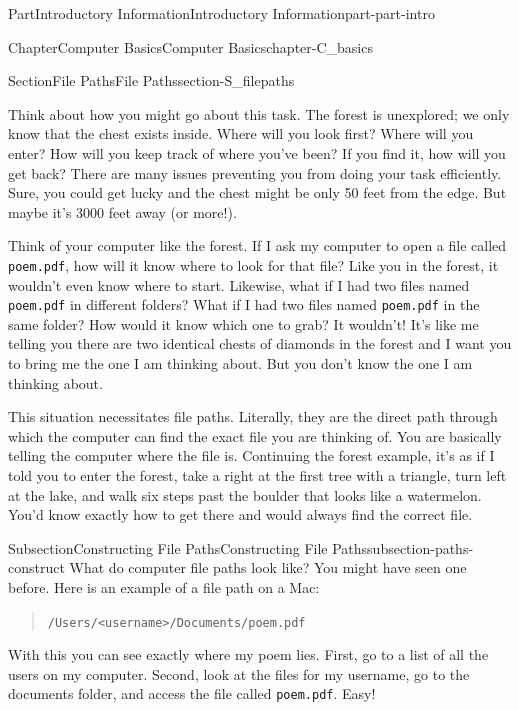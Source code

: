 \documentclass[twoside,10pt,]{book}
\newcommand{\mono}[1]{\texttt{#1}}
\begin{document}
\begin{partptx}{Part}{Introductory Information}{}{Introductory Information}{}{}{part-part-intro}
\begin{chapterptx}{Chapter}{Computer Basics}{}{Computer Basics}{}{}{chapter-C_basics}
\begin{sectionptx}{Section}{File Paths}{}{File Paths}{}{}{section-S_filepaths}
\begin{introduction}{}
\par
Think about how you might go about this task. The forest is unexplored; we only know that the chest exists inside. Where will you look first? Where will you enter? How will you keep track of where you've been? If you find it, how will you get back? There are many issues preventing you from doing your task efficiently. Sure, you could get lucky and the chest might be only 50 feet from the edge. But maybe it's 3000 feet away (or more!).%
\par
Think of your computer like the forest. If I ask my computer to open a file called \mono{poem.pdf}, how will it know where to look for that file? Like you in the forest, it wouldn't even know where to start. Likewise, what if I had two files named \mono{poem.pdf} in different folders? What if I had two files named \mono{poem.pdf} in the same folder? How would it know which one to grab? It wouldn't! It's like me telling you there are two identical chests of diamonds in the forest and I want you to bring me the one I am thinking about. But you don't know the one I am thinking about.%
\par
This situation necessitates file paths. Literally, they are the direct path through which the computer can find the exact file you are thinking of. You are basically telling the computer where the file is. Continuing the forest example, it's as if I told you to enter the forest, take a right at the first tree with a triangle, turn left at the lake, and walk six steps past the boulder that looks like a watermelon. You'd know exactly how to get there and would always find the correct file.%
\end{introduction}%
%
%
\typeout{************************************************}
\typeout{************************************************}
%
\begin{subsectionptx}{Subsection}{Constructing File Paths}{}{Constructing File Paths}{}{}{subsection-paths-construct}
%
%
%
What do computer file paths look like? You might have seen one before. Here is an example of a file path on a Mac:%
\begin{quote}%
\mono{/Users/<username>/Documents/poem.pdf}%
\end{quote}
With this you can see exactly where my poem lies. First, go to a list of all the users on my computer. Second, look at the files for my username, go to the documents folder, and access the file called \mono{poem.pdf}. Easy!%

\end{subsectionptx}
\end{sectionptx}
\end{chapterptx}
\end{partptx}
\end{document}

